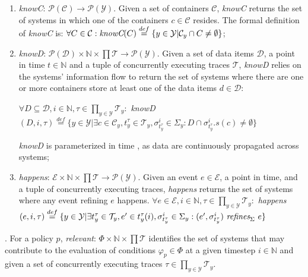 \begin{enumerate}
    \item \emph{knowC}: $\mathcal{P}(\mathcal{C}) \to \mathcal{P}(\mathcal{Y})$. Given a set of containers $\mathcal{C}$, \emph{knowC} returns the set of systems in which one of the containers $c \in \mathcal{C}$ resides. The formal definition of \emph{knowC} is: $\forall C \in \mathcal{C}: \emph{knowC}(C) \overset{def}{=} \{y \in \mathcal{Y} | \mathcal{C}_{y} \cap C \neq \emptyset\}$;
    \item \emph{knowD}: $\mathcal{P}(\mathcal{D}) \times \mathbb{N} \times \prod \mathcal{T} \to \mathcal{P}(\mathcal{Y})$. Given a set of data items $\mathcal{D}$, a point in time $t \in \mathbb{N}$ and a tuple of concurrently executing traces $\mathcal{T}$, \emph{knowD} relies on the systems' information flow to return the set of systems where there are one or more containers store at least one of the data items $d \in \mathcal{D}$:
    
    $\forall D \subseteq \mathcal{D}, i \in \mathbb{N}, \tau \in \prod_{y \in \mathcal{Y}} \mathcal{T}_{y}: $ \emph{knowD}$(D,i,\tau) \overset{def}{=} \{y \in \mathcal{Y} | \exists c \in \mathcal{C}_{y}, t_{y}^{\tau} \in \mathcal{T}_{y}, \sigma_{t_{y}^{\tau}}^{i} \in \Sigma_{y}: D \cap \sigma_{t_{y}^{\tau}}^{i}.s(c) \neq \emptyset \} $
    
    \emph{knowD} is parameterized in time , as data are continuously propagated across systems;
    \item \emph{happens}: $\mathcal{E} \times \mathbb{N} \times \prod \mathcal{T} \to \mathcal{P}(\mathcal{Y})$. Given an event $e \in \mathcal{E}$, a point in time, and a tuple of concurrently executing traces, \emph{happens} returns the set of systems where any event refining $e$ happens.
    $\forall e \in \mathcal{E}, i \in \mathbb{N}, \tau \in \prod_{y \in \mathcal{Y}} \mathcal{T}_{y}:$ \emph{happens}$(e,i,\tau) \overset{def}{=} \{y \in \mathcal{Y} | \exists t_{y}^{\tau} \in \mathcal{T}_{y}, e' \in t_{y}^{\tau}(i), \sigma_{t_{y}^{\tau}}^{i} \in \Sigma_{y}: (e', \sigma_{t_{y}^{\tau}}^{i}) \  \emph{refines}_{\Sigma} \ e\} $
\end{enumerate}
   . For a policy $p$, \emph{relevant}: $\Phi \times \mathbb{N} \times \prod \mathcal{T}$ identifies the set of systems that may contribute to the evaluation of conditions $\varphi_{p} \in \Phi$ at a given timestep $i \in \mathbb{N}$ and given a set of concurrently executing traces $\tau \in \prod_{y \in \mathcal{Y}} \mathcal{T}_{y}$.
   
